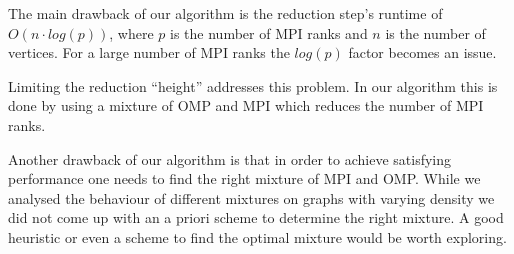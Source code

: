 The main drawback of our algorithm is the reduction step's runtime of $O\left(n \cdot
log\left(p\right)\right)$, where $p$ is the number of MPI ranks and $n$ is the number of vertices.
For a large number of MPI ranks the $log\left(p\right)$ factor becomes an issue.

Limiting the reduction ``height'' addresses this problem. In our algorithm this is done by using a
mixture of OMP and MPI which reduces the number of MPI ranks.

%

Another drawback of our algorithm is that in order to achieve satisfying performance one needs to
find the right mixture of MPI and OMP. While we analysed the behaviour of different mixtures on
graphs with varying density we did not come up with an a priori scheme to determine the right
mixture. A good heuristic or even a scheme to find the optimal mixture would be worth exploring.

